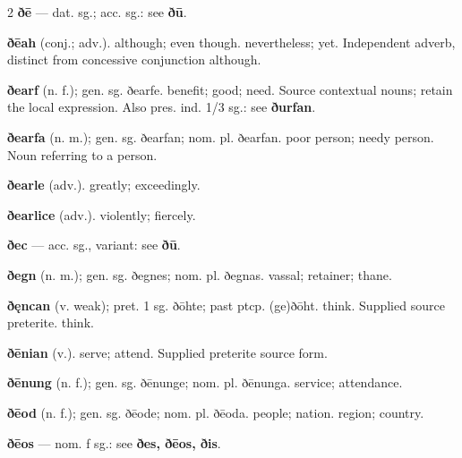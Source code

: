 \begin{multicols*}{2}
\textbf{ðē} — dat. sg.; acc. sg.: see \textbf{ðū}.\par
\textbf{ðēah} (conj.; adv.). although; even though. nevertheless; yet. Independent adverb, distinct from concessive conjunction although.\par
\textbf{ðearf} (n. f.); gen. sg. ðearfe. benefit; good; need. Source contextual nouns; retain the local expression. Also pres. ind. 1/3 sg.: see \textbf{ðurfan}.\par
\textbf{ðearfa} (n. m.); gen. sg. ðearfan; nom. pl. ðearfan. poor person; needy person. Noun referring to a person.\par
\textbf{ðearle} (adv.). greatly; exceedingly.\par
\textbf{ðearlice} (adv.). violently; fiercely.\par
\textbf{ðec} — acc. sg., variant: see \textbf{ðū}.\par
\textbf{ðegn} (n. m.); gen. sg. ðegnes; nom. pl. ðegnas. vassal; retainer; thane.\par
\textbf{ðęncan} (v. weak); pret. 1 sg. ðōhte; past ptcp. (ge)ðōht. think. Supplied source preterite. think.\par
\textbf{ðēnian} (v.). serve; attend. Supplied preterite source form.\par
\textbf{ðēnung} (n. f.); gen. sg. ðēnunge; nom. pl. ðēnunga. service; attendance.\par
\textbf{ðēod} (n. f.); gen. sg. ðēode; nom. pl. ðēoda. people; nation. region; country.\par
\textbf{ðēos} — nom. f sg.: see \textbf{ðes, ðēos, ðis}.\par

\end{multicols*}
